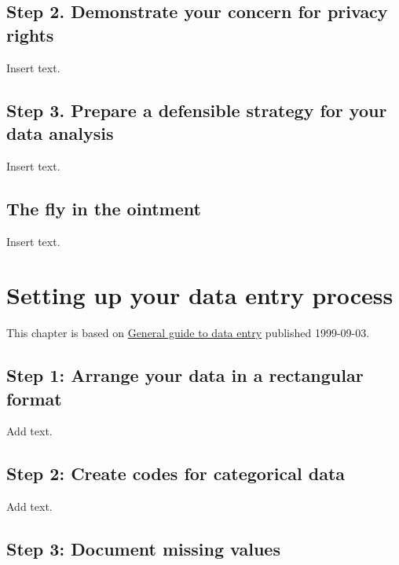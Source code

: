 \documentclass[
  letterpaper,
  DIV=11,
  numbers=noendperiod]{scrreprt}
\begin{document}
\section{Step 2. Demonstrate your concern for privacy
rights}\label{step-2.-demonstrate-your-concern-for-privacy-rights}

Insert text.

\section{Step 3. Prepare a defensible strategy for your data
analysis}\label{step-3.-prepare-a-defensible-strategy-for-your-data-analysis}

Insert text.

\section{The fly in the ointment}\label{the-fly-in-the-ointment-5}

Insert text.


\chapter{Setting up your data entry
process}\label{setting-up-your-data-entry-process}

This chapter is based on
\href{http://www.pmean.com/99/entry.html}{General guide to data entry}
published 1999-09-03.

\section{Step 1: Arrange your data in a rectangular
format}\label{step-1-arrange-your-data-in-a-rectangular-format}

Add text.

\section{Step 2: Create codes for categorical
data}\label{step-2-create-codes-for-categorical-data}

Add text.

\section{Step 3: Document missing
values}\label{step-3-document-missing-values}
\end{document}
